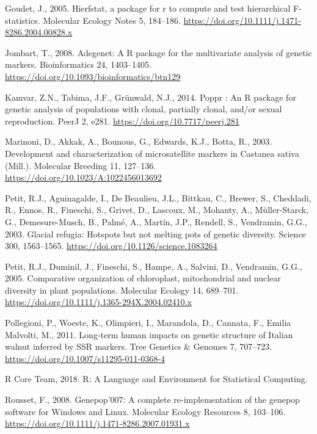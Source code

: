 \documentclass[12pt,a4paper,]{report}
\begin{document}
\hypertarget{refs}{}
\leavevmode\hypertarget{ref-goudet_hierfstat_2005}{}%
Goudet, J., 2005. Hierfstat, a package for r to compute and test
hierarchical F-statistics. Molecular Ecology Notes 5, 184--186.
\url{https://doi.org/10.1111/j.1471-8286.2004.00828.x}

\leavevmode\hypertarget{ref-Jombart2008}{}%
Jombart, T., 2008. Adegenet: A R package for the multivariate analysis
of genetic markers. Bioinformatics 24, 1403--1405.
\url{https://doi.org/10.1093/bioinformatics/btn129}

\leavevmode\hypertarget{ref-Kamvar2014}{}%
Kamvar, Z.N., Tabima, J.F., Grünwald, N.J., 2014. Poppr : An R package
for genetic analysis of populations with clonal, partially clonal,
and/or sexual reproduction. PeerJ 2, e281.
\url{https://doi.org/10.7717/peerj.281}

\leavevmode\hypertarget{ref-marinoni_development_2003}{}%
Marinoni, D., Akkak, A., Bounous, G., Edwards, K.J., Botta, R., 2003.
Development and characterization of microsatellite markers in Castanea
sativa (Mill.). Molecular Breeding 11, 127--136.
\url{https://doi.org/10.1023/A:1022456013692}

\leavevmode\hypertarget{ref-Petit2003}{}%
Petit, R.J., Aguinagalde, I., De Beaulieu, J.L., Bittkau, C., Brewer,
S., Cheddadi, R., Ennos, R., Fineschi, S., Grivet, D., Lascoux, M.,
Mohanty, A., Müller-Starck, G., Demesure-Musch, B., Palmé, A., Martín,
J.P., Rendell, S., Vendramin, G.G., 2003. Glacial refugia: Hotspots but
not melting pots of genetic diversity. Science 300, 1563--1565.
\url{https://doi.org/10.1126/science.1083264}

\leavevmode\hypertarget{ref-Petit2005}{}%
Petit, R.J., Duminil, J., Fineschi, S., Hampe, A., Salvini, D.,
Vendramin, G.G., 2005. Comparative organization of chloroplast,
mitochondrial and nuclear diversity in plant populations. Molecular
Ecology 14, 689--701.
\url{https://doi.org/10.1111/j.1365-294X.2004.02410.x}

\leavevmode\hypertarget{ref-Pollegioni2011}{}%
Pollegioni, P., Woeste, K., Olimpieri, I., Marandola, D., Cannata, F.,
Emilia Malvolti, M., 2011. Long-term human impacts on genetic structure
of Italian walnut inferred by SSR markers. Tree Genetics \& Genomes 7,
707--723. \url{https://doi.org/10.1007/s11295-011-0368-4}

\leavevmode\hypertarget{ref-RCoreTeam2018}{}%
R Core Team, 2018. R: A Language and Environment for Statistical
Computing.

\leavevmode\hypertarget{ref-Rousset2008}{}%
Rousset, F., 2008. Genepop'007: A complete re-implementation of the
genepop software for Windows and Linux. Molecular Ecology Resources 8,
103--106. \url{https://doi.org/10.1111/j.1471-8286.2007.01931.x}
\end{document}
